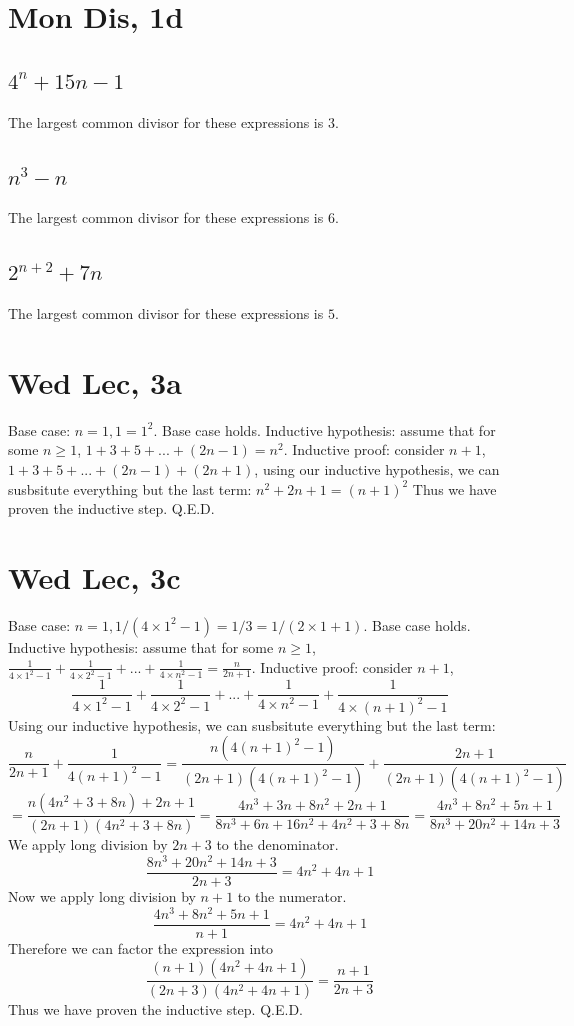 \documentclass[12pt]{article}
\begin{document}
\section{Mon Dis, 1d}
\subsection{$4^n + 15n -1$}
The largest common divisor for these expressions is $3$.

\subsection{$n^3 - n$}
The largest common divisor for these expressions is $6$.

\subsection{$2^{n+2} + 7n$}
The largest common divisor for these expressions is $5$.
\newpage


\section{Wed Lec, 3a}
Base case: $n = 1, 1 = 1^2$. Base case holds.
\newline
Inductive hypothesis: assume that for some $n \geq 1$, $1+ 3 + 5 + ... + (2n-1) = n^2$.
\newline
Inductive proof: consider $n+1$, $1+ 3 + 5 + ... + (2n-1) + (2n+1)$, using our inductive hypothesis, we can susbsitute everything but the last term: $n^2 + 2n + 1 = (n+1)^2$
\newline
Thus we have proven the inductive step. Q.E.D.

\section{Wed Lec, 3c}
Base case: $n = 1, 1/(4 \times 1^2 - 1) = 1/3 = 1/(2 \times 1 + 1)$. Base case holds.
\newline
Inductive hypothesis: assume that for some $n \geq 1$, $\frac{1}{4 \times 1^2 - 1} + \frac{1}{4 \times 2^2 - 1} + ... + \frac{1}{4 \times n^2 - 1} = \frac{n}{2n+1}$.
\newline
Inductive proof: consider $n+1$, $$\frac{1}{4 \times 1^2 - 1} + \frac{1}{4 \times 2^2 - 1} + ... + \frac{1}{4 \times n^2 - 1} + \frac{1}{4 \times (n+1)^2 - 1}$$
Using our inductive hypothesis, we can susbsitute everything but the last term: $$\frac{n}{2n+1} + \frac{1}{4(n+1)^2 - 1} = \frac{n (4(n+1)^2-1)}{(2n+1)(4(n+1)^2-1)} + \frac{2n+1}{(2n+1)(4(n+1)^2 - 1)}$$
$$=\frac{n(4n^2+3+8n) + 2n +1}{(2n+1)(4n^2+3+8n)} = \frac{4n^3+3n+8n^2+2n+1}{8n^3+6n+16n^2+4n^2+3+8n}=\frac{4n^3+8n^2+5n+1}{8n^3+20n^2+14n+3}$$
We apply long division by $2n+3$ to the denominator.
$$\frac{8n^3+20n^2+14n+3}{2n+3} = 4n^2 + 4n + 1$$
Now we apply long division by $n+1$ to the numerator.
$$\frac{4n^3+8n^2+5n+1}{n+1} =  4n^2 + 4n + 1$$
Therefore we can factor the expression into
$$\frac{(n+1)(4n^2 + 4n + 1)}{(2n+3)(4n^2 + 4n + 1)} = \frac{n+1}{2n+3}$$
\newline
Thus we have proven the inductive step. Q.E.D.
\end{document}

